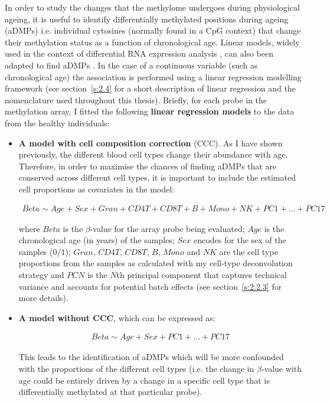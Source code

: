 \bigskip

In order to study the changes that the methylome undergoes during physiological ageing, it is useful to identify differentially methylated positions during ageing (\acrshort{aDMPs}) i.e. individual cytosines (normally found in a CpG context) that change their methylation status as a function of chronological age. Linear models, widely used in the context of differential RNA expression analysis \citep{Ritchie2015}, can also been adapted to find aDMPs \citep{Zhuang2012,Teschendorff2018}. In the case of a continuous variable (such as chronological age) the association is performed using a linear regression modelling framework \citep{Zhuang2012} (see section~\ref{s:2.4} for a short description of linear regression and the nomenclature used throughout this thesis). Briefly, for each probe in the methylation array, I fitted the following \textbf{linear regression models} to the data from the healthy individuals:

\begin{itemize}

	\item \textbf{A model with cell composition correction} (\acrshort{CCC}). As I have shown previously, the different blood cell types change their abundance with age. Therefore, in order to maximise the chances of finding aDMPs that are conserved across different cell types, it is important to include the estimated cell proportions as covariates in the model:
	
	\begin{align} \label{eq:2.10}
	Beta \sim Age + Sex+ Gran + CD4T + CD8T + B + Mono + NK + PC1 + ... + PC17
	\end{align}
	
	where $Beta$ is the $\beta$-value for the array probe being evaluated; $Age$ is the chronological age (in years) of the samples; $Sex$ encodes for the sex of the samples (0/1); $Gran$, $CD4T$, $CD8T$, $B$, $Mono$ and $NK$ are the cell type proportions from the samples as calculated with my cell-type deconvolution strategy and $PCN$ is the $N$th principal component that captures technical variance and accounts for potential batch effects (see section~\ref{s:2.2.3} for more details).    
	
	\item \textbf{A model without CCC}, which can be expressed as:
	
	\begin{align} \label{eq:2.11}
	Beta \sim Age + Sex+ PC1 + ... + PC17
	\end{align}
	
	This leads to the identification of aDMPs which will be more confounded with the proportions of the different cell types (i.e. the change in $\beta$-value with age could be entirely driven by a change in a specific cell type that is differentially methylated at that particular probe).
	
\end{itemize}

